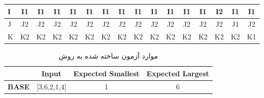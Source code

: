 \documentclass[twoside]{article}
\newenvironment{answer}{}{\medskip}
\begin{document}
\begin{answer}
\begin{table}[h]
\begin{latin}
\begin{tabular}{l|c|c|c|c|c|c|c|c|c|c|c|c|c|c|c|}
\multicolumn{1}{|l|}{I} & I1                                 & I1                                & I1                                & I1                                & I1                                & I1                                & I1                                & I1                                & I1                                & I1                                & I1                                 & I1                                 & I2                                 & I1                                 & I1                                 \\ \hline
\multicolumn{1}{|l|}{J} & J2                                 & J2                                & J2                                & J2                                & J2                                & J2                                & J2                                & J2                                & J2                                & J2                                & J2                                 & J2                                 & J2                                 & J1                                 & J2                                 \\ \hline
\multicolumn{1}{|l|}{K} & K2                                 & K2                                & K2                                & K2                                & K2                                & K2                                & K2                                & K2                                & K2                                & K2                                & K2                                 & K2                                 & K2                                 & K2                                 & K1                                 \\ \hline
	\end{tabular}
	\end{latin}
	\end{table}
	\begin{table}[h]
		\centering
		\caption{موارد آزمون ساخته شده به روش }
		\label{tbl:bcc-test-cases-2}
		\begin{latin}
\begin{tabular}{c|c|c|c|}
\cline{2-4}
                                    & \textbf{Input}              & \textbf{Expected Smallest}   & \textbf{Expected Largest}  \\ \hline
\multicolumn{1}{|c|}{\textbf{BASE}} & {[}3,6,2,1,4{]}             & 1                            & 6                          \\ \hline

\end{tabular}
\end{latin}
\end{table}
\end{answer}
\end{document}

